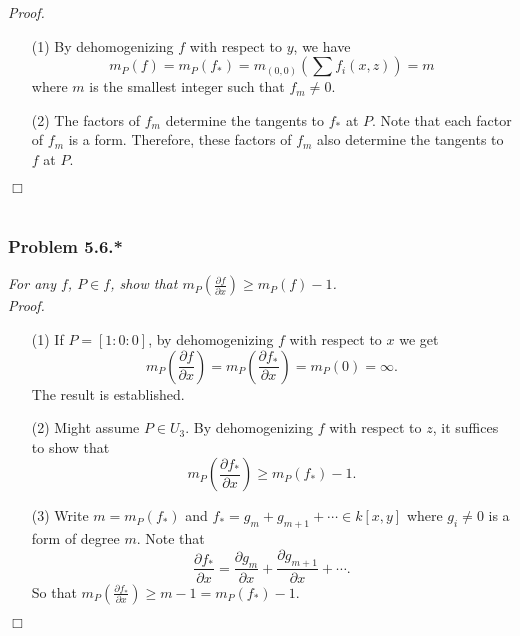 \documentclass{article}
\begin{document}
\emph{Proof.}
\begin{enumerate}
\item[(1)]
  By dehomogenizing $f$ with respect to $y$,
  we have
  \[
    m_P(f)
    = m_P(f_{*})
    = m_{(0,0)}\left( \sum f_i(x,z) \right)
    = m
  \]
  where $m$ is the smallest integer such that $f_m \neq 0$.

\item[(2)]
  The factors of $f_m$ determine the tangents to $f_{*}$ at $P$.
  Note that each factor of $f_m$ is a form.
  Therefore, these factors of $f_m$ also determine the tangents to $f$ at $P$.
\end{enumerate}
$\Box$ \\\\






\subsubsection*{Problem 5.6.*}
\emph{For any $f$, $P \in f$,
show that $m_{P}\left( \frac{\partial f}{\partial x} \right) \geq m_{P}(f)-1$.} \\



\emph{Proof.}
\begin{enumerate}
\item[(1)]
  If $P = [1:0:0]$, by dehomogenizing $f$ with respect to $x$
  we get
  \[
    m_{P}\left( \frac{\partial f}{\partial x} \right)
    = m_{P}\left( \frac{\partial f_{*}}{\partial x} \right)
    = m_{P}(0)
    = \infty.
  \]
  The result is established.

\item[(2)]
  Might assume $P \in U_3$.
  By dehomogenizing $f$ with respect to $z$, it suffices to show that
  \[
    m_{P}\left( \frac{\partial f_{*}}{\partial x} \right) \geq m_{P}(f_{*})-1.
  \]

\item[(3)]
  Write $m = m_{P}(f_{*})$ and $f_{*} = g_m + g_{m+1} + \cdots \in k[x,y]$
  where $g_{i} \neq 0$ is a form of degree $m$.
  Note that
  \[
    \frac{\partial f_{*}}{\partial x}
    = \frac{\partial g_m}{\partial x} + \frac{\partial g_{m+1}}{\partial x} + \cdots.
  \]
  So that
  $m_{P}\left( \frac{\partial f_{*}}{\partial x} \right) \geq m-1 = m_{P}(f_{*})-1$.
\end{enumerate}
$\Box$ \\\\
\end{document}
